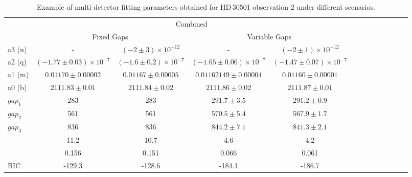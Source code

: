 \begin{table}
    \small
    \caption[Example of multi-detector fitting parameters and correlation.]{Example of multi-detector fitting parameters obtained for HD\,30501 observation 2 under different scenarios.}
    \begin{tabular}{|l|c|c|c|c|c|c|c|c|c|c|c|c|}
        \toprule
        & \multicolumn{4}{c|}{Combined}  \\
        & \multicolumn{2}{c|}{Fixed Gaps} & \multicolumn{2}{c|}{Variable Gaps} \\ \midrule
        a3 (u) & - & $(-2\pm 3) \times 10^{-12}$ & - & $(-2 \pm 1)\times 10^{-12}$ \\
        a2 (q) & $(-1.77 \pm 0.03) \times 10^{-7}$ & $(-1.6 \pm 0.2)\times 10^{-7}$ & $(-1.65 \pm 0.06) \times 10^{-7}$ & $(-1.47 \pm 0.07)\times 10^{-7}$ \\
        a1 (m) & $0.01170 \pm 0.00002$ & $0.01167 \pm 0.00005$ & $0.01162149 \pm 0.00004$ & $0.01160 \pm 0.00001$  \\
        a0 (b) & $2111.83 \pm 0.01$ & $2111.84 \pm 0.02$ & $2111.86 \pm 0.02$ & $2111.87 \pm 0.01$ \\
        \(gap_{1}\) & 283 & 283 & $291.7 \pm 3.5$ & $291.2 \pm 0.9$ \\
        \(gap_{2}\) & 561 & 561 & $570.5 \pm 5.4$ & $567.9 \pm 1.7$ \\
        \(gap_{3}\) & 836 & 836 & $844.2 \pm 7.1$ & $841.3 \pm 2.1$ \\
        \textchisquared{} & 11.2 & 10.7 & 4.6 & 4.2 \\
        \textchisquaredreduced{} & 0.156 & 0.151 & 0.066 & 0.061 \\
        {BIC} & -129.3 & -128.6 & -184.1 & -186.7 \\
        \bottomrule
    \end{tabular}\label{tab:example_calibration_parameters}
\end{table}